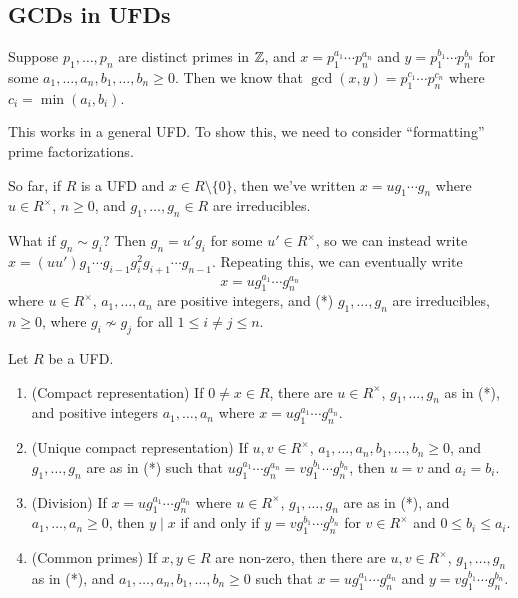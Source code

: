 \documentclass[12pt,letterpaper]{report}
\begin{document}
\pagebreak
\subsection{GCDs in UFDs}

Suppose $p_1, \ldots, p_n$ are distinct primes in $\mathbb{Z}$, and $x = p_1^{a_1} \cdots p_n^{a_n}$ and
$y = p_1^{b_1} \cdots p_n^{b_n}$ for some $a_1, \ldots, a_n, b_1, \ldots, b_n \geq 0$.
Then we know that $\gcd(x, y) = p_1^{c_1} \cdots p_n^{c_n}$ where $c_i = \min(a_i, b_i)$.

This works in a general UFD.
To show this, we need to consider ``formatting'' prime factorizations.

So far, if $R$ is a UFD and $x \in R \setminus \{0\}$, then we've written $x = ug_1 \cdots g_n$
where $u \in R^\times$, $n \geq 0$, and $g_1, \ldots, g_n \in R$ are irreducibles.

What if $g_n \sim g_i$?
Then $g_n = u'g_i$ for some $u' \in R^\times$, so we can instead write
$x = (uu')g_1 \cdots g_{i - 1} g_i^2 g_{i + 1} \cdots g_{n - 1}$.
Repeating this, we can eventually write
\[ x = ug_1^{a_1} \cdots g_n^{a_n} \]
where $u \in R^\times$, $a_1, \ldots, a_n$ are positive integers, and (*) $g_1, \ldots, g_n$ are
irreducibles, $n \geq 0$, where $g_i \not\sim g_j$ for all $1 \leq i \neq j \leq n$.

\begin{prop}{}{}
  Let $R$ be a UFD.
  \begin{enumerate}
    \item (Compact representation)
      If $0 \neq x \in R$, there are $u \in R^\times$, $g_1, \ldots, g_n$ as in (*), and
      positive integers $a_1, \ldots, a_n$ where $x = ug_1^{a_1} \cdots g_n^{a_n}$.
    \item (Unique compact representation)
      If $u, v \in R^\times$, $a_1, \ldots, a_n, b_1, \ldots, b_n \geq 0$, and $g_1, \ldots, g_n$
      are as in (*) such that $ug_1^{a_1} \cdots g_n^{a_n} = vg_1^{b_1} \cdots g_n^{b_n}$, then
      $u = v$ and $a_i = b_i$.
    \item (Division)
      If $x = ug_1^{a_1} \cdots g_n^{a_n}$ where $u \in R^\times$, $g_1, \ldots, g_n$ are as in
      (*), and $a_1, \ldots, a_n \geq 0$, then $y \mid x$ if and only if
      $y = vg_1^{b_1} \cdots g_n^{b_n}$ for $v \in R^\times$ and $0 \leq b_i \leq a_i$.
    \item (Common primes)
      If $x, y \in R$ are non-zero, then there are $u, v \in R^\times$, $g_1, \ldots, g_n$ as in
      (*), and $a_1, \ldots, a_n, b_1, \ldots, b_n \geq 0$ such that
      $x = ug_1^{a_1} \cdots g_n^{a_n}$ and $y = vg_1^{b_1} \cdots g_n^{b_n}$.
  \end{enumerate}
\end{prop}
\end{document}
